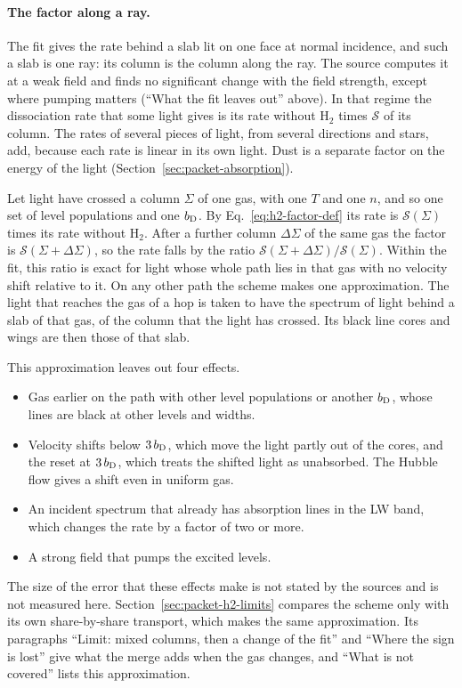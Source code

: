 \paragraph{The factor along a ray.} The fit gives the rate behind a slab lit on
one face at normal incidence, and such a slab is one ray: its column is the
column along the ray. The source computes it at a weak field and finds no
significant change with the field strength, except where pumping matters
(``What the fit leaves out'' above). In that regime the dissociation rate that some
light gives is its rate without H$_2$ times $\mathcal S$ of its column. The
rates of several pieces of light, from several directions and stars, add,
because each rate is linear in its own light. Dust is a separate factor on the
energy of the light (Section~\ref{sec:packet-absorption}).

Let light have crossed a column $\Sigma$ of one gas, with one $T$ and one $n$,
and so one set of level populations and one $b_{\rm D}$. By
Eq.~\eqref{eq:h2-factor-def} its rate is $\mathcal S(\Sigma)$ times its rate
without H$_2$. After a further column $\Delta\Sigma$ of the same gas the factor
is $\mathcal S(\Sigma+\Delta\Sigma)$, so the rate falls by the ratio
$\mathcal S(\Sigma+\Delta\Sigma)/\mathcal S(\Sigma)$. Within the fit, this
ratio is exact for light whose whole path lies in that gas with no velocity
shift relative to it. On any other path the scheme makes one approximation.
The light that reaches the gas of a hop is taken to have the spectrum of light
behind a slab of that gas, of the column that the light has crossed. Its black
line cores and wings are then those of that slab.

This approximation leaves out four effects.
\begin{itemize}
  \item Gas earlier on the path with other level populations or another
    $b_{\rm D}$, whose lines are black at other levels and widths.
  \item Velocity shifts below $3\,b_{\rm D}$, which move the light partly out
    of the cores, and the reset at $3\,b_{\rm D}$, which treats the shifted
    light as unabsorbed. The Hubble flow gives a shift even in uniform gas.
  \item An incident spectrum that already has absorption lines in the LW band,
    which changes the rate by a factor of two or more.
  \item A strong field that pumps the excited levels.
\end{itemize}
The size of the error that these effects make is not stated by the sources and
is not measured here. Section~\ref{sec:packet-h2-limits} compares the scheme
only with its own share-by-share transport, which makes the same
approximation. Its paragraphs ``Limit: mixed columns, then a change of the
fit'' and ``Where the sign is lost'' give what the merge adds when the gas
changes, and ``What is not covered'' lists this approximation.

